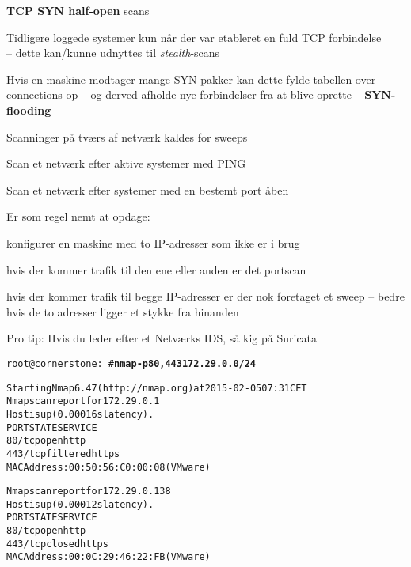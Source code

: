 \documentclass[Screen16to9,17pt]{foils}
\begin{document}
\begin{list2}
\item {\bfseries TCP SYN half-open} scans
\item Tidligere loggede systemer kun når der var etableret en fuld TCP
  forbindelse\\
  -- dette kan/kunne udnyttes til \emph{stealth}-scans
\item Hvis en maskine modtager mange SYN pakker kan dette fylde
  tabellen over connections op -- og derved afholde nye forbindelser
  fra at blive oprette -- {\bfseries SYN-flooding}
\end{list2}



\begin{list1}
\item Scanninger på tværs af netværk kaldes for sweeps
\item Scan et netværk efter aktive systemer med PING
\item Scan et netværk efter systemer med en bestemt port åben
\item Er som regel nemt at opdage:
  \begin{list2}
    \item konfigurer en maskine med to IP-adresser som ikke er i brug
\item hvis der kommer trafik til den ene eller anden er det portscan
\item hvis der kommer trafik til begge IP-adresser er der nok
  foretaget et sweep -- bedre hvis de to adresser ligger et stykke fra hinanden
  \end{list2}

\vskip 2cm
Pro tip: Hvis du leder efter et Netværks IDS, så kig på Suricata 
\end{list1}


\begin{alltt}\small
root@cornerstone:~#{\bfseries  nmap -p80,443 172.29.0.0/24}

Starting Nmap 6.47 ( http://nmap.org ) at 2015-02-05 07:31 CET
Nmap scan report for 172.29.0.1
Host is up (0.00016s latency).
PORT    STATE    SERVICE
{\color{darkgreen}80/tcp  open     http}
443/tcp filtered https
MAC Address: 00:50:56:C0:00:08 (VMware)

Nmap scan report for 172.29.0.138
Host is up (0.00012s latency).
PORT    STATE  SERVICE
{\color{darkgreen}80/tcp  open   http}
443/tcp closed https
MAC Address: 00:0C:29:46:22:FB (VMware)

\end{alltt}
\end{document}
